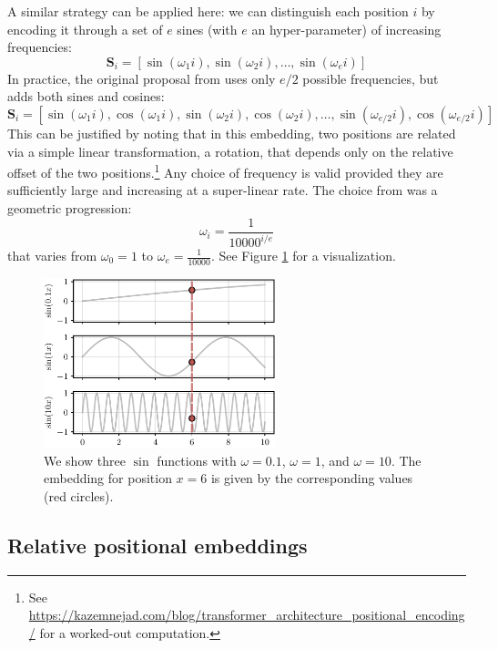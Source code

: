A similar strategy can be applied here: we can distinguish each position $i$ by encoding it through a set of $e$ sines (with $e$ an hyper-parameter) of increasing frequencies:
%
$$
\mathbf{S}_i=\left[ \sin(\omega_1i), \sin(\omega_2i),\ldots,\sin(\omega_ei) \right]
$$
%
In practice, the original proposal from \cite{vaswani2017attention} uses only $e/2$ possible frequencies, but adds both sines and cosines:
%
$$
\mathbf{S}_i=\left[ \sin(\omega_1i), \cos(\omega_1i),\sin(\omega_2i), \cos(\omega_2i),\ldots,\sin(\omega_{e/2}i), \cos(\omega_{e/2}i) \right]
$$
%
This can be justified by noting that in this embedding, two positions are related via a simple linear transformation, a rotation, that depends only on the relative offset of the two positions.\footnote{See \url{https://kazemnejad.com/blog/transformer_architecture_positional_encoding/} for a worked-out computation.} Any choice of frequency is valid provided they are sufficiently large and increasing at a super-linear rate. The choice from \cite{vaswani2017attention} was a geometric progression:
%
$$
\omega_i=\frac{1}{10000^{i/e}}
$$
%
that varies from $\omega_0=1$ to $\omega_e=\frac{1}{10000}$. See Figure \ref{fig:positional_embeddings_plot} for a visualization.

\begin{figure}
    \centering
    \hspace{1em}\includegraphics[width=0.6\textwidth]{images/positional_embeddings_plot}
    \caption{We show three $\sin$ functions with $\omega=0.1$, $\omega=1$, and $\omega=10$. The embedding for position $x=6$ is given by the corresponding values (red circles).}
    \label{fig:positional_embeddings_plot}
\end{figure}

\subsection{Relative positional embeddings}

